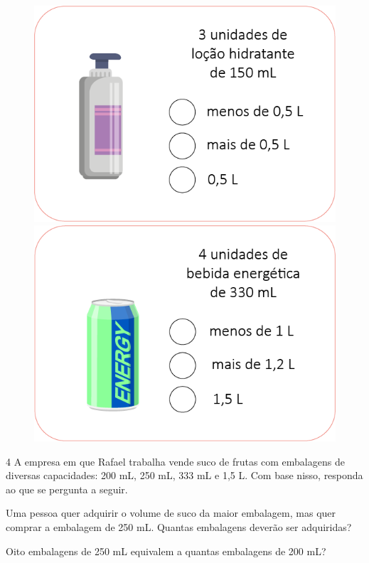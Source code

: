 \pagebreak
\begin{figure}[htpb!]
\includegraphics[width=.5\textwidth]{media/image23.png}
\includegraphics[width=.5\textwidth]{media/image24.png}
\end{figure}


\num{4} A empresa em que Rafael trabalha vende suco de frutas com embalagens de
diversas capacidades: 200 mL, 250 mL, 333 mL e 1,5 L. Com base nisso, responda ao que se pergunta a seguir.

\begin{escolha}
\item Uma pessoa quer adquirir o volume de suco da maior embalagem,
  mas quer comprar a embalagem de 250 mL. Quantas embalagens deverão ser adquiridas?


\item Oito embalagens de 250 mL equivalem a quantas embalagens de 200 mL?

\end{escolha}


